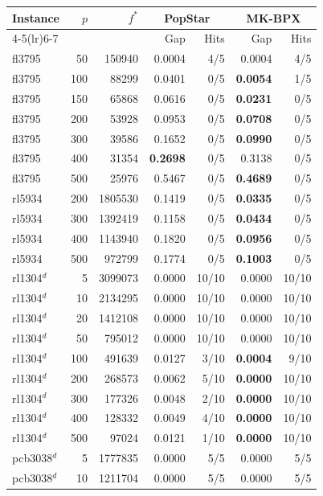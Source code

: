 \begin{tabular}{lrrrrrr}
\toprule
Instance & $p$ & $f^*$ & \multicolumn{2}{c}{PopStar} & \multicolumn{2}{c}{MK-BPX} \\
\cmidrule(lr){4-5}\cmidrule(lr){6-7}
 & & & Gap & Hits & Gap & Hits \\
\midrule
fl3795 & 50 & 150940 & 0.0004 & 4/5 & 0.0004 & 4/5 \\
fl3795 & 100 & 88299 & 0.0401 & 0/5 & \textbf{0.0054} & 1/5 \\
fl3795 & 150 & 65868 & 0.0616 & 0/5 & \textbf{0.0231} & 0/5 \\
fl3795 & 200 & 53928 & 0.0953 & 0/5 & \textbf{0.0708} & 0/5 \\
fl3795 & 300 & 39586 & 0.1652 & 0/5 & \textbf{0.0990} & 0/5 \\
fl3795 & 400 & 31354 & \textbf{0.2698} & 0/5 & 0.3138 & 0/5 \\
fl3795 & 500 & 25976 & 0.5467 & 0/5 & \textbf{0.4689} & 0/5 \\
\addlinespace[2pt]
rl5934 & 200 & 1805530 & 0.1419 & 0/5 & \textbf{0.0335} & 0/5 \\
rl5934 & 300 & 1392419 & 0.1158 & 0/5 & \textbf{0.0434} & 0/5 \\
rl5934 & 400 & 1143940 & 0.1820 & 0/5 & \textbf{0.0956} & 0/5 \\
rl5934 & 500 & 972799 & 0.1774 & 0/5 & \textbf{0.1003} & 0/5 \\
\addlinespace[2pt]
rl1304$^{d}$ & 5 & 3099073 & 0.0000 & 10/10 & 0.0000 & 10/10 \\
rl1304$^{d}$ & 10 & 2134295 & 0.0000 & 10/10 & 0.0000 & 10/10 \\
rl1304$^{d}$ & 20 & 1412108 & 0.0000 & 10/10 & 0.0000 & 10/10 \\
rl1304$^{d}$ & 50 & 795012 & 0.0000 & 10/10 & 0.0000 & 10/10 \\
rl1304$^{d}$ & 100 & 491639 & 0.0127 & 3/10 & \textbf{0.0004} & 9/10 \\
rl1304$^{d}$ & 200 & 268573 & 0.0062 & 5/10 & \textbf{0.0000} & 10/10 \\
rl1304$^{d}$ & 300 & 177326 & 0.0048 & 2/10 & \textbf{0.0000} & 10/10 \\
rl1304$^{d}$ & 400 & 128332 & 0.0049 & 4/10 & \textbf{0.0000} & 10/10 \\
rl1304$^{d}$ & 500 & 97024 & 0.0121 & 1/10 & \textbf{0.0000} & 10/10 \\
\addlinespace[2pt]
pcb3038$^{d}$ & 5 & 1777835 & 0.0000 & 5/5 & 0.0000 & 5/5 \\
pcb3038$^{d}$ & 10 & 1211704 & 0.0000 & 5/5 & 0.0000 & 5/5 \\

\end{tabular}
